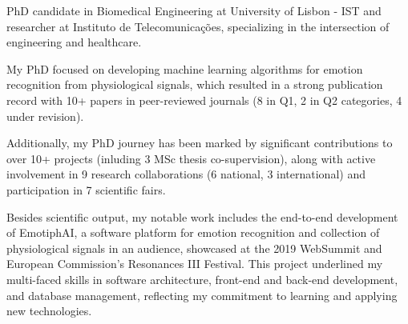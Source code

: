 

\begin{cvparagraph}

PhD candidate in Biomedical Engineering at University of Lisbon - IST and researcher at Instituto de Telecomunicações, specializing in the intersection of engineering and healthcare. 

My PhD focused on developing machine learning algorithms for emotion recognition from physiological signals, which resulted in a strong publication record with 10+ papers in peer-reviewed journals (8 in Q1, 2 in Q2 categories, 4 under revision). 

Additionally, my PhD journey has been marked by significant contributions to over 10+ projects (inluding 3 MSc thesis co-supervision), along with active involvement in 9 research collaborations (6 national, 3 international) and participation in 7 scientific fairs.

Besides scientific output, my notable work includes the end-to-end development of EmotiphAI, a software platform for emotion recognition and collection of physiological signals in an audience, showcased at the 2019 WebSummit and European Commission's Resonances III Festival. This project underlined my multi-faced skills in software architecture, front-end and back-end development, and database management, reflecting my commitment to learning and applying new technologies.
\end{cvparagraph}
